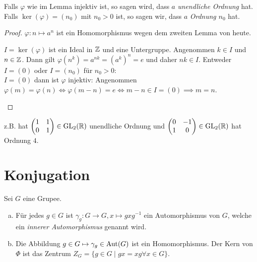 \begin{definition}
	Falls $\varphi$ wie im Lemma injektiv ist, so sagen wird, dass $a$ \emph{unendliche Ordnung} hat.
	Falls $\ker(\varphi) = (n_0)$ mit $n_0 > 0$ ist, so sagen wir, dass $a$ \emph{Ordnung $n_0$} hat.
\end{definition}

\begin{proof}
	$\varphi: n \mapsto a^{n}$ ist ein Homomorphismus wegen dem zweiten Lemma von heute.
	\begin{remark}
		$I = \ker(\varphi)$ ist ein Ideal in $\mathbb{Z}$ und eine Untergruppe.
		Angenommen  $k \in I$ und $n \in \mathbb{Z}$. Dann gilt $\varphi(n^{k}) = a^{nk} = (a^{k})^{n} = e$ und daher $nk \in I$.
		Entweder $I = (0)$ oder $I = (n_0)$ für $n_0 > 0$:\\
		$I = (0)$ dann ist $\varphi$ injektiv:
		Angenommen $\varphi(m) = \varphi(n) \Leftrightarrow \varphi(m-n) = e \Leftrightarrow m-n \in I = (0) \implies m=n$.
	\end{remark}
\end{proof}

\begin{eg}
	z.B. hat
	$\begin{pmatrix} 
		1 & 1\\ 0 &1
	\end{pmatrix} \in \operatorname{GL}_2(\mathbb{R})$ unendliche Ordnung und  $\begin{pmatrix} 
		0 &-1\\ 1 & 0
	\end{pmatrix} \in \operatorname{GL}_2(\mathbb{R})$ hat Ordnung $4$.
\end{eg}

\section{Konjugation}

\begin{lemma}
	Sei $G$ eine Grupee.
	\begin{enumerate}[a)]
		\item Für jedes $g \in G$ ist $\gamma_{g}: G \to G, x \mapsto g x g^{-1}$ ein Automorphismus von $G$, welche ein \emph{innerer Automorphismus} genannt wird.
		\item Die Abbildung $g \in G \mapsto \gamma_{g} \in \operatorname{Aut}(G)$ ist ein Homomorphismus.
			Der Kern von $\Phi$ ist das Zentrum $Z_{G} = \{g \in G \mid gx = xg \forall x \in G\} $.
	\end{enumerate}
\end{lemma}


